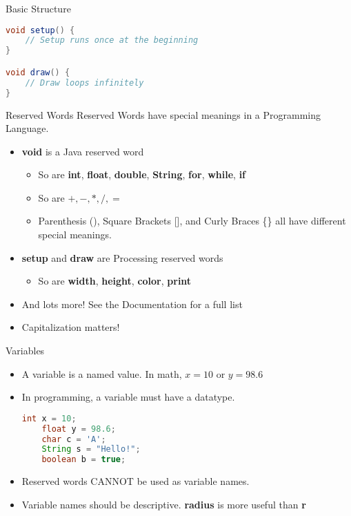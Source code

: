 \documentclass[pdf]{beamer}
\begin{document}
\begin{frame}[fragile]{Basic Structure}
\begin{lstlisting}[language=Java]
void setup() {
    // Setup runs once at the beginning
}

void draw() {
    // Draw loops infinitely
}
\end{lstlisting}
\end{frame}

\begin{frame}{Reserved Words}
Reserved Words have special meanings in a Programming Language.\\
\begin{itemize}
\item \textbf{void} is a Java reserved word
    \begin{itemize}
        \item So are \textbf{int}, \textbf{float}, \textbf{double}, \textbf{String}, \textbf{for}, \textbf{while}, \textbf{if} %
        \item So are $\mathbf{+}, \mathbf{-}, \mathbf{*}, \mathbf{/}, \mathbf{=}$
        \item Parenthesis (), Square Brackets [], and Curly Braces \{\} all have different special meanings.
    \end{itemize}

\item \textbf{setup} and \textbf{draw} are Processing reserved words
    \begin{itemize}
        \item So are \textbf{width}, \textbf{height}, \textbf{color}, \textbf{print} %
    \end{itemize}
\item And lots more! See the Documentation for a full list
\item Capitalization matters!
\end{itemize}
\end{frame}

\begin{frame}[fragile]{Variables}
\begin{itemize}
\item A variable is a named value. In math, $x = 10$ or $y = 98.6$\\
\item In programming, a variable must have a datatype.
\begin{lstlisting}[language=Java]
    int x = 10;
    float y = 98.6;
    char c = 'A';
    String s = "Hello!";
    boolean b = true;
\end{lstlisting}
\item Reserved words CANNOT be used as variable names.
\item Variable names should be descriptive. \textbf{radius} is more useful than \textbf{r}
\end{itemize}

\end{frame}
\end{document}
